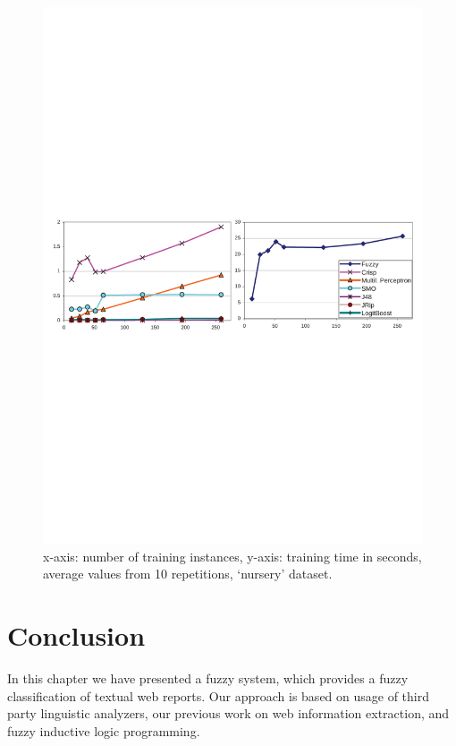 \begin{figure}
\centerline{\includegraphics[width=\hsize]{learning_speed}}
\caption{x-axis: number of training instances, y-axis: training time in seconds, average values from 10 repetitions, `nursery' dataset.}
\label{img:learning_speed}
\end{figure}



\section{Conclusion} \label{sec:conclusion}
In this chapter we have presented a fuzzy system, which provides a fuzzy classification of textual web reports. Our approach is based on usage of third party linguistic analyzers, our previous work on web information extraction, and fuzzy inductive logic programming.

